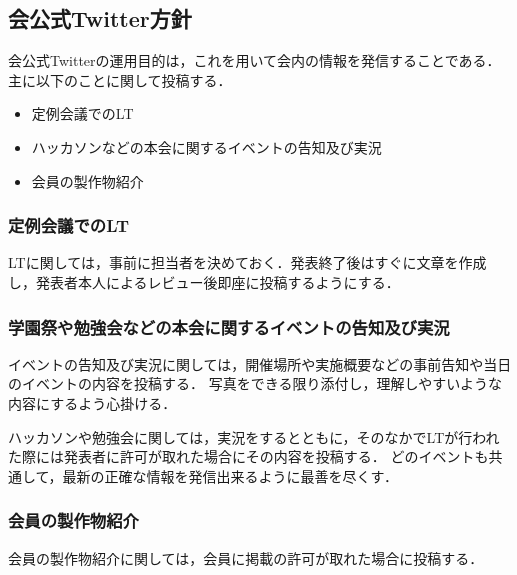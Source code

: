 \subsection*{会公式Twitter方針}


会公式Twitterの運用目的は，これを用いて会内の情報を発信することである．主に以下のことに関して投稿する．
\begin{itemize}
\item 定例会議でのLT
\item ハッカソンなどの本会に関するイベントの告知及び実況
\item 会員の製作物紹介
\end{itemize}

\subsubsection*{定例会議でのLT}
LTに関しては，事前に担当者を決めておく．発表終了後はすぐに文章を作成し，発表者本人によるレビュー後即座に投稿するようにする．

\subsubsection*{学園祭や勉強会などの本会に関するイベントの告知及び実況}
イベントの告知及び実況に関しては，開催場所や実施概要などの事前告知や当日のイベントの内容を投稿する．
写真をできる限り添付し，理解しやすいような内容にするよう心掛ける．

ハッカソンや勉強会に関しては，実況をするとともに，そのなかでLTが行われた際には発表者に許可が取れた場合にその内容を投稿する．
どのイベントも共通して，最新の正確な情報を発信出来るように最善を尽くす．

\subsubsection*{会員の製作物紹介}
会員の製作物紹介に関しては，会員に掲載の許可が取れた場合に投稿する．


